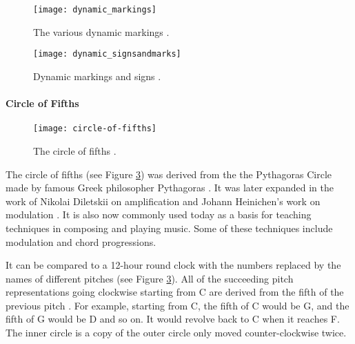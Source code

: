 \begin{figure}[H]
	\centering
	\texttt{[image: dynamic\_markings]}
    \caption{The various dynamic markings \citep{peter2016dynamic}.}
    \label{fig:MUSIC_dynamic}
\end{figure}

\begin{figure}[H]
	\centering
	\texttt{[image: dynamic\_signsandmarks]}
    \caption{Dynamic markings and signs \citep{dummy2016volume}.}
    \label{fig:MUSIC_dynamicsignsmarkings}
\end{figure}
 
        \paragraph{Circle of Fifths}
        
\begin{figure}[H]
	\centering
	\texttt{[image: circle-of-fifths]}
    \caption{The circle of fifths \citep{gleaves2015understanding}.}
    \label{fig:MUSIC_circleoffifths}
\end{figure}
        
        The circle of fifths (see Figure \ref{fig:MUSIC_circleoffifths}) was derived from the the Pythagoras Circle made by famous Greek philosopher Pythagoras \citep{jensen1992circle}. It was later expanded in the work of Nikolai Diletskii on amplification and Johann Heinichen's work on modulation \citep{jensen1992circle}. It is also now commonly used today as a basis for teaching techniques in composing and playing music. Some of these techniques include modulation and chord progressions. %
        
         It can be compared to a 12-hour round clock with the numbers replaced by the names of different pitches (see Figure \ref{fig:MUSIC_circleoffifths}). All of the succeeding pitch representations going clockwise starting from C are derived from the fifth of the previous pitch \citep{jensen1992circle}. For example, starting from C, the fifth of C would be G, and the fifth of G would be D and so on. It would revolve back to C when it reaches F. The inner circle is a copy of the outer circle only moved counter-clockwise twice.
        
        
